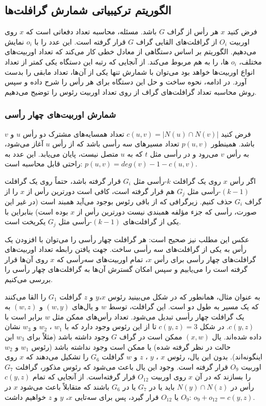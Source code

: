 \subsection{الگوریتم ترکیبیاتی شمارش گرافلت‌ها}
فرض کنید $x$ هر رأس از گراف $G$ باشد. مسئله، محاسبه تعداد دفعاتی است که $x$  روی اوربیت $O_i$ از گرافلت‌های القایی گراف $G$ قرار گرفته است. این عدد را با $o_i$ نمایش می‌دهیم. الگوریتم بر اساس دستگاهی از معادل خطی کار می‌کند که تعداد اوربیت‌های مختلف، $o_i$ ها، را به هم مربوط می‌کند. از آنجایی که رتبه این دستگاه یکی کمتر از تعداد انواع اوربیت‌ها خواهد بود می‌توان با شمارش تنها یکی از آن‌ها، تعداد مابقی را بدست آورد. در ادامه، نحوه ساخت و حل این دستگاه برای هر رأس را شرح داده و سپس روش محاسبه تعداد گرافلت‌های گراف از روی تعداد اوربیت رئوس را توضیح می‌دهیم.

\subsubsection{شمارش اوربیت‌های چهار رأسی}
فرض کنید $c(u,v) = |N(u) \cap N(v)|$ تعداد همسایه‌های مشترک دو رأس $u$ و $v$ باشد. همینطور $p(u,v)$ تعداد مسیرهای سه رأسی باشد که از رأس $u$ آغاز می‌شود، به رأس $v$ می‌رود و در رأسی مثل $t$ که به $u$ متصل نیست، پایان می‌یابد. این عدد به راحتی قابل محاسبه است: 
$p(u,v) = deg(v) -1 -c(u,v)$.

اگر رأس $x$ روی یک گرافلت $k$-رأسی مثل $G_i$ قرار گرفته باشد، حتماً روی یک گرافلت $(k-1)$-رأسی مثل $G_j$ هم قرار گرفته است، کافی است دورترین رأس از $x$ را از گراف $G_i$ حذف کنیم. زیرگرافی که از باقی رئوس بوجود می‌آید همبند است (در غیر این صورت، رأسی که جزء مؤلفه همبندی نیست دورترین رأس از $x$ بوده است) بنابراین با یکی از گرافلت‌های $(k-1)$-رأسی مثل $G_j$ یکریخت است.

عکس این مطلب نیز صحیح است: هر گرافلت چهار رأسی را می‌توان با افزودن یک رأس به یکی از گرافلت‌های سه رأسی ساخت. جهت یافتن رابطه تعداد اوربیت‌های گرافلت‌های چهار رأسی برای رأس $x$، تمام اوربیت‌های سه‌رأسی که $x$ روی آن‌ها قرار گرفته است را می‌یابیم و سپس امکان گسترش آن‌ها به گرافلت‌های چهار رأسی را بررسی می‌کنیم.

به عنوان مثال، همانطور که در شکل  می‌بینید رئوس $x$،$y$ و $z$ گرافلت $G_1$ را القا می‌کنند که یک مسیر به طول دو است. این گرافلت، توسط $w$ و یال‌های $(w,y)$ و $(w,z)$ به یک گرافلت چهار رأسی تبدیل می‌شود. تعداد رأس‌های ممکن مثل $w$ برابر است با $c(y,z)$. در شکل $c(y,z) = 3$ تا از این رئوس وجود دارد که با $w_1$ ، $w_2$ و $w_3$ نشان داده شده‌اند. یال $(x,w)$ ممکن است در گراف $G$ وجود داشته باشد (مثلاً برای $w_3$ این حالت در نظر گرفته شده) یا ممکن است وجود نداشته باشد (رئوس $w_1$ و $w_2$ اینگونه‌اند). بدون این یال، رئوس $x$ ، $y$ ، $z$ و $w$ گرافلت $G_6$ را تشکیل می‌دهند که $x$ روی اوربیت $O_9$ قرار گرفته است. وجود این یال باعث می‌شود که رئوس مذکور، گرافلت $G_7$ را بسازند که در آن $x$ روی اوربیت $O_{12}$ قرار گرفته‌است. از آنجایی که تمام $c(y,z)$ رأس در $N(y) \cap N(z)$ باید یا در $G_7$ یا در $G_6$ باشند که متقابلاً باعث می‌شود $x$ در $O_9$ یا $O_{12}$ قرار گیرد، پس برای سه‌تایی $x$، $y$ و $z$ خواهیم داشت: $o_9 + o_{12} = c(y,z)$.

